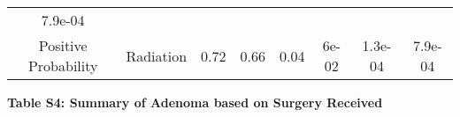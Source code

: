 \documentclass[12pt,]{article}
\begin{document}
\begin{longtable}[]{@{}cccccccc@{}}
\begin{minipage}[t]{0.08\columnwidth}
7.9e-04\strut
\end{minipage}\tabularnewline
\begin{minipage}[t]{0.12\columnwidth}\centering\strut
Positive Probability\strut
\end{minipage} & \begin{minipage}[t]{0.11\columnwidth}\centering\strut
Radiation\strut
\end{minipage} & \begin{minipage}[t]{0.13\columnwidth}\centering\strut
0.72\strut
\end{minipage} & \begin{minipage}[t]{0.08\columnwidth}\centering\strut
0.66\strut
\end{minipage} & \begin{minipage}[t]{0.13\columnwidth}\centering\strut
0.04\strut
\end{minipage} & \begin{minipage}[t]{0.07\columnwidth}\centering\strut
6e-02\strut
\end{minipage} & \begin{minipage}[t]{0.06\columnwidth}\centering\strut
1.3e-04\strut
\end{minipage} & \begin{minipage}[t]{0.08\columnwidth}\centering\strut
7.9e-04\strut
\end{minipage}\tabularnewline
\bottomrule
\end{longtable}

\elandscape

\newpage

\textbf{Table S4: Summary of Adenoma based on Surgery Received}
\end{document}
